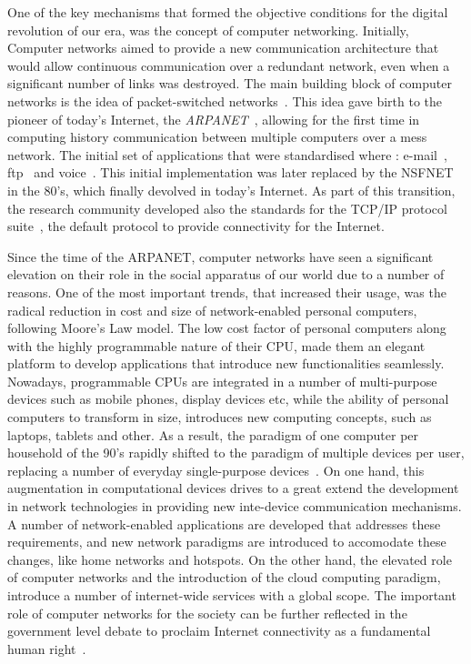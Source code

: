One of the key mechanisms that formed the objective conditions for the digital revolution
of our era, was the concept of computer networking. Initially, Computer networks aimed to
provide a new communication architecture that would allow
continuous communication over a redundant network, even when a significant
number of links was destroyed.  The main building block of computer networks is
the idea of packet-switched networks~\cite{Licklider1963}.  This idea gave birth
to the pioneer of today's Internet, the {\it ARPANET}~\cite{Mills:1987tt},
allowing for the first time in computing history communication between multiple
computers over a mess network. The initial set of applications that were
standardised where : e-mail~\cite{RFC0561}, ftp~\cite{RFC0354} and
voice~\cite{RFC0741}. This initial implementation was later replaced by the
NSFNET in the 80's, which finally devolved in today's Internet.
As part of this transition, the research community developed also the standards
for the TCP/IP protocol suite~\cite{Clark:1988}, the default protocol to provide
connectivity for the Internet.

Since the time of the ARPANET, computer networks have seen a significant
elevation on their role in the social apparatus of our world due to a number of
reasons. One of the most important trends, that increased their usage, was the
radical reduction in cost and size of network-enabled personal
computers, following Moore's Law model. The low cost factor of personal
computers along with the highly programmable nature of
their CPU, made them an elegant platform to develop applications that
introduce new functionalities seamlessly. Nowadays, programmable CPUs are
integrated in a number of multi-purpose devices such as mobile phones, display
devices etc, while the ability of personal computers to transform in size,
introduces new computing concepts, such as laptops, tablets and other.
As a result, the paradigm of one computer per household of the 90's rapidly
shifted to the paradigm of multiple devices per user, replacing a number of
everyday single-purpose devices~\cite{Dholakia:2006vn}.  On one hand, this
augmentation in computational devices drives to a great extend the development
in network technologies in providing new inte-device communication mechanisms. 
A number of network-enabled applications are
developed that addresses these requirements, and new network paradigms are
introduced to accomodate these changes, like home networks and hotspots. 
On the other hand, the elevated role
of computer networks and the introduction of the cloud computing paradigm,
introduce a number of internet-wide services with a global scope. 
The important role of computer networks for the society
can be further reflected in the government level debate to proclaim
Internet connectivity as a fundamental human right~\cite{klang2005human}.

